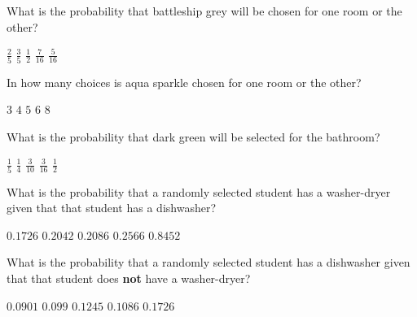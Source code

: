 \documentclass[answers,12pt]{exam}
\begin{document}
\begin{questions}
\question
What is the probability that battleship grey will be chosen
for one room or the other?\\
\begin{oneparchoices}
\choice $\frac{2}{5}$ %
\correctchoice $\frac{3}{5}$
\choice $\frac{1}{2}$ %
\choice $\frac{7}{16}$ %
\choice $\frac{5}{16}$ %
\end{oneparchoices}

\question
In how many choices is aqua sparkle chosen for
one room or the other?\\
\begin{oneparchoices}
\choice $3$
\correctchoice $4$
\choice $5$ %
\choice $6$ %
\choice $8$
\end{oneparchoices}

\question\label{LastColor}
What is the probability that dark green will be selected
for the bathroom?\\
\begin{oneparchoices}
\correctchoice $\frac{1}{5}$
\choice $\frac{1}{4}$ %
\choice $\frac{3}{10}$ %
\choice $\frac{3}{16}$ %
\choice $\frac{1}{2}$ %
\end{oneparchoices}


\question\label{FirstAmes} What is the probability that a randomly selected
student has a washer-dryer given that that student has a dishwasher?\\
\begin{oneparchoices}
\choice $0.1726$ %
\correctchoice $0.2042$
\choice $0.2086$ %
\choice $0.2566$ %
\choice $0.8452$ %
\end{oneparchoices}

\question\label{LastAmes} What is the probability that a randomly selected
student has a dishwasher given that that student does {\bf not}
have a washer-dryer?\\
\begin{oneparchoices}
\correctchoice $0.0901$
\choice $0.099$ %
\choice $0.1245$ %
\choice $0.1086$ %
\choice $0.1726$ %
\end{oneparchoices}


\end{questions}
\end{document}
